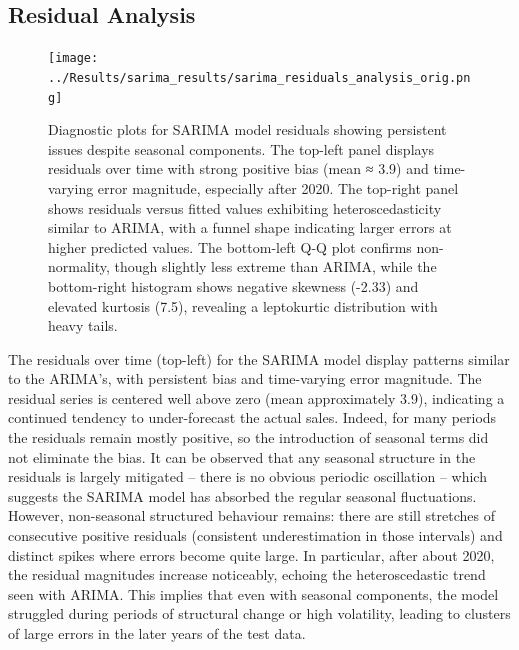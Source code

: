 \documentclass[12pt,a4paper]{report}
\begin{document}
\subsection{Residual Analysis}
\begin{figure}[htbp]
\centering
\texttt{[image: ../Results/sarima\_results/sarima\_residuals\_analysis\_orig.png]}
\caption{Diagnostic plots for SARIMA model residuals showing persistent issues despite seasonal components. The top-left panel displays residuals over time with strong positive bias (mean ≈ 3.9) and time-varying error magnitude, especially after 2020. The top-right panel shows residuals versus fitted values exhibiting heteroscedasticity similar to ARIMA, with a funnel shape indicating larger errors at higher predicted values. The bottom-left Q-Q plot confirms non-normality, though slightly less extreme than ARIMA, while the bottom-right histogram shows negative skewness (-2.33) and elevated kurtosis (7.5), revealing a leptokurtic distribution with heavy tails.}
\label{fig:sarima_residuals}
\end{figure}

The residuals over time (top-left) for the SARIMA model display patterns similar to the ARIMA's, with persistent bias and time-varying error magnitude. The residual series is centered well above zero (mean approximately 3.9), indicating a continued tendency to under-forecast the actual sales. Indeed, for many periods the residuals remain mostly positive, so the introduction of seasonal terms did not eliminate the bias. It can be observed that any seasonal structure in the residuals is largely mitigated – there is no obvious periodic oscillation – which suggests the SARIMA model has absorbed the regular seasonal fluctuations. However, non-seasonal structured behaviour remains: there are still stretches of consecutive positive residuals (consistent underestimation in those intervals) and distinct spikes where errors become quite large. In particular, after about 2020, the residual magnitudes increase noticeably, echoing the heteroscedastic trend seen with ARIMA. This implies that even with seasonal components, the model struggled during periods of structural change or high volatility, leading to clusters of large errors in the later years of the test data. 
\end{document}
